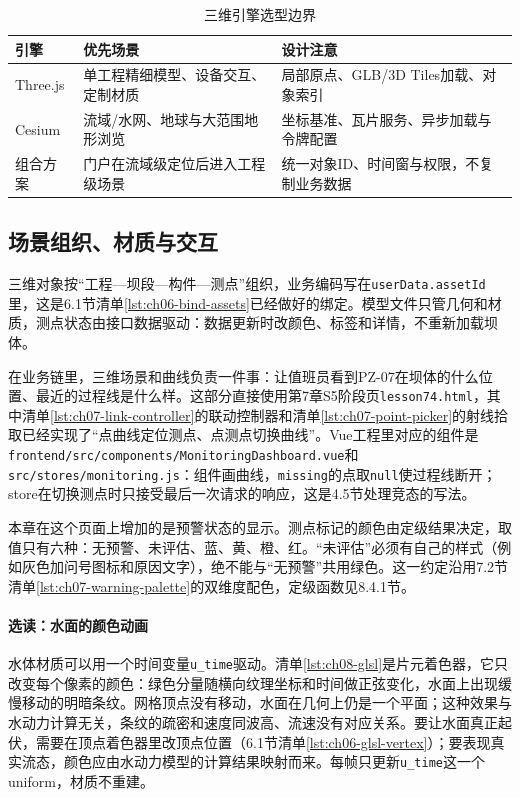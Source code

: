 \begin{table}[htbp]
\centering
\caption{三维引擎选型边界}
\label{tab:three-cesium-selection}
\begin{tabular}{p{2.4cm}p{4.6cm}p{5.3cm}}
\toprule
引擎 & 优先场景 & 设计注意 \\
\midrule
Three.js & 单工程精细模型、设备交互、定制材质 & 局部原点、GLB/3D Tiles加载、对象索引 \\
Cesium & 流域/水网、地球与大范围地形浏览 & 坐标基准、瓦片服务、异步加载与令牌配置 \\
组合方案 & 门户在流域级定位后进入工程级场景 & 统一对象ID、时间窗与权限，不复制业务数据 \\
\bottomrule
\end{tabular}
\end{table}

\subsection{场景组织、材质与交互}

三维对象按“工程—坝段—构件—测点”组织，业务编码写在\texttt{userData.assetId}里，这是6.1节清单\ref{lst:ch06-bind-assets}已经做好的绑定。模型文件只管几何和材质，测点状态由接口数据驱动：数据更新时改颜色、标签和详情，不重新加载坝体。

在业务链里，三维场景和曲线负责一件事：让值班员看到PZ-07在坝体的什么位置、最近的过程线是什么样。这部分直接使用第7章S5阶段页\texttt{lesson74.html}，其中清单\ref{lst:ch07-link-controller}的联动控制器和清单\ref{lst:ch07-point-picker}的射线拾取已经实现了“点曲线定位测点、点测点切换曲线”。Vue工程里对应的组件是\texttt{frontend/src/components/MonitoringDashboard.vue}和\texttt{src/stores/monitoring.js}：组件画曲线，\texttt{missing}的点取\texttt{null}使过程线断开；store在切换测点时只接受最后一次请求的响应，这是4.5节处理竞态的写法。

本章在这个页面上增加的是预警状态的显示。测点标记的颜色由定级结果决定，取值只有六种：无预警、未评估、蓝、黄、橙、红。“未评估”必须有自己的样式（例如灰色加问号图标和原因文字），绝不能与“无预警”共用绿色。这一约定沿用7.2节清单\ref{lst:ch07-warning-palette}的双维度配色，定级函数见8.4.1节。

\paragraph{选读：水面的颜色动画}水体材质可以用一个时间变量\texttt{u\_time}驱动。清单\ref{lst:ch08-glsl}是片元着色器，它只改变每个像素的颜色：绿色分量随横向纹理坐标和时间做正弦变化，水面上出现缓慢移动的明暗条纹。网格顶点没有移动，水面在几何上仍是一个平面；这种效果与水动力计算无关，条纹的疏密和速度同波高、流速没有对应关系。要让水面真正起伏，需要在顶点着色器里改顶点位置（6.1节清单\ref{lst:ch06-glsl-vertex}）；要表现真实流态，颜色应由水动力模型的计算结果映射而来。每帧只更新\texttt{u\_time}这一个uniform，材质不重建。

